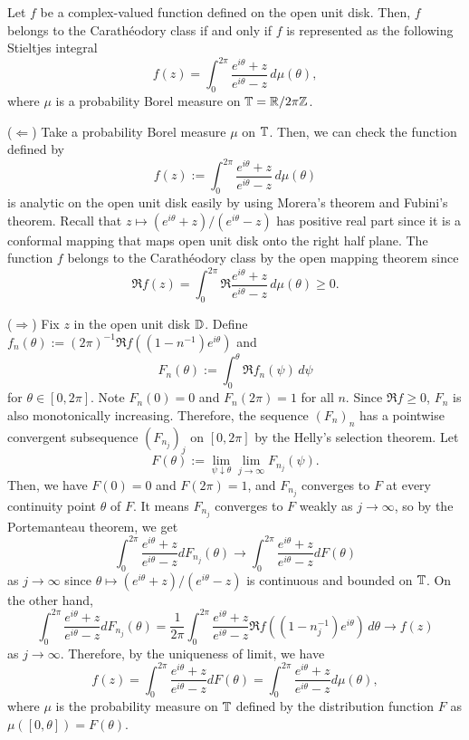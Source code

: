 \documentclass[12pt]{article}
\begin{document}
\begin{thm}
Let $f$ be a complex-valued function defined on the open unit disk.
Then, $f$ belongs to the Carath\'eodory class if and only if $f$ is represented as the following Stieltjes integral
\[f(z)=\int_0^{2\pi}\frac{e^{i\theta}+z}{e^{i\theta}-z}\,d\mu(\theta),\]
where $\mu$ is a probability Borel measure on $\mathbb{T}=\mathbb{R}/2\pi\mathbb{Z}$.
\end{thm}
\begin{pf}
($\Leftarrow$)
Take a probability Borel measure $\mu$ on $\mathbb{T}$.
Then, we can check the function defined by
\[f(z):=\int_0^{2\pi}\frac{e^{i\theta}+z}{e^{i\theta}-z}\,d\mu(\theta)\]
is analytic on the open unit disk easily by using Morera's theorem and Fubini's theorem.
Recall that $z\mapsto(e^{i\theta}+z)/(e^{i\theta}-z)$ has positive real part since it is a conformal mapping that maps open unit disk onto the right half plane.
The function $f$ belongs to the Carath\'eodory class by the open mapping theorem since
\[\Re f(z)=\int_0^{2\pi}\Re\frac{e^{i\theta}+z}{e^{i\theta}-z}\,d\mu(\theta)\ge0.\]

($\Rightarrow$)
Fix $z$ in the open unit disk $\mathbb{D}$.
Define $f_n(\theta):=(2\pi)^{-1}\Re f((1-n^{-1})e^{i\theta})$ and
\[F_n(\theta):=\int_0^\theta\Re f_n(\psi)\,d\psi\]
for $\theta\in[0,2\pi]$.
Note $F_n(0)=0$ and $F_n(2\pi)=1$ for all $n$.
Since $\Re f\ge0$, $F_n$ is also monotonically increasing.
Therefore, the sequence $(F_n)_n$ has a pointwise convergent subsequence $(F_{n_j})_j$ on $[0,2\pi]$ by the Helly's selection theorem.
Let
\[F(\theta):=\lim_{\psi\downarrow\theta}\lim_{j\to\infty}F_{n_j}(\psi).\]
Then, we have $F(0)=0$ and $F(2\pi)=1$, and $F_{n_j}$ converges to $F$ at every continuity point $\theta$ of $F$.
It means $F_{n_j}$ converges to $F$ weakly as $j\to\infty$, so by the Portemanteau theorem, we get
\[\int_0^{2\pi}\frac{e^{i\theta}+z}{e^{i\theta}-z}dF_{n_j}(\theta)\to\int_0^{2\pi}\frac{e^{i\theta}+z}{e^{i\theta}-z}dF(\theta)\]
as $j\to\infty$ since $\theta\mapsto(e^{i\theta}+z)/(e^{i\theta}-z)$ is continuous and bounded on $\mathbb{T}$.
On the other hand,
\[\int_0^{2\pi}\frac{e^{i\theta}+z}{e^{i\theta}-z}dF_{n_j}(\theta)
=\frac1{2\pi}\int_0^{2\pi}\frac{e^{i\theta}+z}{e^{i\theta}-z}\Re f((1-n_j^{-1})e^{i\theta})\,d\theta\to f(z)\]
as $j\to\infty$.
Therefore, by the uniqueness of limit, we have
\[f(z)=\int_0^{2\pi}\frac{e^{i\theta}+z}{e^{i\theta}-z}dF(\theta)=\int_0^{2\pi}\frac{e^{i\theta}+z}{e^{i\theta}-z}d\mu(\theta),\]
where $\mu$ is the probability measure on $\mathbb{T}$ defined by the distribution function $F$ as $\mu([0,\theta])=F(\theta)$.
\end{pf}
\end{document}

